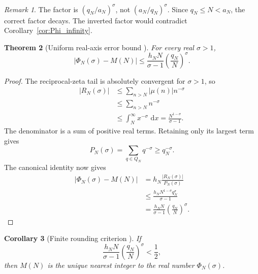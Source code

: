 \documentclass[11pt]{amsart}
\numberwithin{equation}{section}
\theoremstyle{plain}
\newtheorem{theorem}{Theorem}[section]
\newtheorem{corollary}[theorem]{Corollary}
\theoremstyle{definition}
\theoremstyle{remark}
\newtheorem{remark}[theorem]{Remark}
\newcommand{\1}{\mathbf{1}}
\newcommand{\dd}{\,\mathrm{d}}
\begin{document}
\begin{remark}
\label{rem:orientation_growth}
The factor is \((q_N/a_N)^\sigma\), not
\((a_N/q_N)^\sigma\).  Since \(q_N\leq N<a_N\), the correct factor
decays.  The inverted factor would contradict
Corollary~\ref{cor:Phi_infinity}.
\end{remark}


\begin{theorem}[Uniform real-axis error bound {}]
\label{thm:rounding_bound}
For every real \(\sigma>1\),
\begin{equation}
\boxed{
|\Phi_N(\sigma)-M(N)|
\leq
\frac{h_NN}{\sigma-1}
\left(\frac{q_N}{N}\right)^\sigma.
}
\label{eq:rounding_bound}
\end{equation}
\end{theorem}

\begin{proof}
The reciprocal-zeta tail is absolutely convergent for \(\sigma>1\), so
\begin{align}
|R_N(\sigma)|
&\leq
\sum_{n>N}|\mu(n)|n^{-\sigma}
\label{eq:rounding_abs_mu}
\\
&\leq
\sum_{n>N}n^{-\sigma}
\label{eq:rounding_drop_mu}
\\
&\leq
\int_N^\infty x^{-\sigma}\,\dd x
=
\frac{N^{1-\sigma}}{\sigma-1}.
\label{eq:rounding_integral_detailed}
\end{align}
The denominator is a sum of positive real terms.  Retaining only its
largest term gives
\begin{equation}
P_N(\sigma)
=
\sum_{q\in Q_N}q^{-\sigma}
\geq
q_N^{-\sigma}.
\label{eq:rounding_P_positive}
\end{equation}
The canonical identity now gives
\begin{align}
|\Phi_N(\sigma)-M(N)|
&=
h_N\frac{|R_N(\sigma)|}{P_N(\sigma)}
\label{eq:rounding_identity_use}
\\
&\leq
\frac{h_NN^{1-\sigma}q_N^\sigma}{\sigma-1}
\label{eq:rounding_combine}
\\
&=
\frac{h_NN}{\sigma-1}
\left(\frac{q_N}{N}\right)^\sigma.
\label{eq:rounding_final_detailed}
\end{align}
\end{proof}


\begin{corollary}[Finite rounding criterion {}]
\label{cor:rounding_criterion}
If
\begin{equation}
\boxed{
\frac{h_NN}{\sigma-1}
\left(\frac{q_N}{N}\right)^\sigma
<
\frac12,
}
\label{eq:rounding_criterion}
\end{equation}
then \(M(N)\) is the unique nearest integer to the real number
\(\Phi_N(\sigma)\).
\end{corollary}
\end{document}

